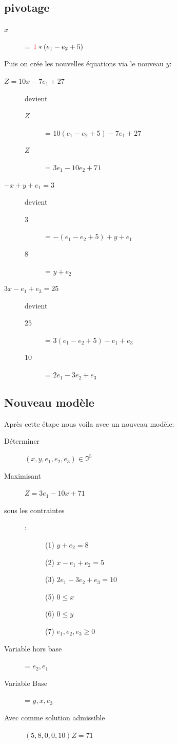\subsection{pivotage}
\begin{description}
\item[$x$] = $\textcolor{red}{1}*(e_1 - e_2 + 5)$
\end{description}

Puis on crée les nouvelles équations via le nouveau $y$:
\begin{description}
\item[$Z = 10x - 7e_1 + 27$] devient
\begin{description}
\item[$Z$] = $10(e_1 - e_2 + 5) - 7e_1 + 27$
\item[$Z$] = $3e_1 - 10e_2 + 71$
\end{description}
\item[$-x + y + e_1 = 3$] devient
\begin{description}
\item[$3$] = $-(e_1 - e_2 + 5) + y + e_1$
\item[$8$] = $y + e_2$
\end{description}
\item[$3x - e_1 + e_3 = 25$] devient
\begin{description}
\item[$25$] = $3(e_1 - e_2 + 5) -e_1 + e_3$
\item[$10$] = $2e_1 - 3e_2 + e_3$
\end{description}
\end{description}

\subsection{Nouveau modèle}
Après cette étape nous voila avec un nouveau modèle:
\begin{description}
\item[Déterminer] $(x,y,e_1,e_2,e_3) \in \Im^5$
\item[Maximisant] $Z = 3e_1 - 10x + 71$
\item[sous les contraintes]:
\begin{description}
\item[] (1) $y + e_2 = 8$
\item[] (2) $x - e_1 + e_2 = 5$
\item[] (3) $2e_1 - 3e_2 + e_3 = 10$
\item[] (5) $ 0 \leq x$
\item[] (6) $ 0 \leq y$
\item[] (7) $ e_1,e_2,e_3 \geq 0$
\end{description}
\item[Variable hors base] = $e_2,e_1$
\item[Variable Base] = $y,x,e_3$
\item[Avec comme solution admissible] $(5,8,0,0,10) Z=71$
\end{description}


